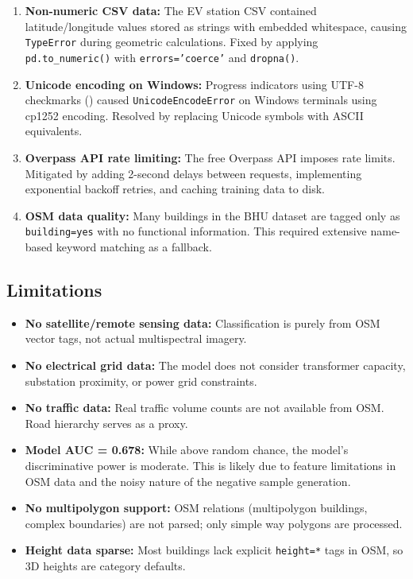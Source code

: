\documentclass[12pt, a4paper]{article}
\begin{document}
\begin{enumerate}
    \item \textbf{Non-numeric CSV data:} The EV station CSV contained 
    latitude/longitude values stored as strings with embedded 
    whitespace, causing \texttt{TypeError} during geometric 
    calculations. Fixed by applying \texttt{pd.to\_numeric()} with 
    \texttt{errors='coerce'} and \texttt{dropna()}.
    
    \item \textbf{Unicode encoding on Windows:} Progress indicators 
    using UTF-8 checkmarks (\checkmark) caused 
    \texttt{UnicodeEncodeError} on Windows terminals using cp1252 
    encoding. Resolved by replacing Unicode symbols with ASCII 
    equivalents.
    
    \item \textbf{Overpass API rate limiting:} The free Overpass API 
    imposes rate limits. Mitigated by adding 2-second delays between 
    requests, implementing exponential backoff retries, and caching 
    training data to disk.
    
    \item \textbf{OSM data quality:} Many buildings in the BHU 
    dataset are tagged only as \texttt{building=yes} with no 
    functional information. This required extensive name-based keyword 
    matching as a fallback.
\end{enumerate}

\subsection{Limitations}

\begin{itemize}
    \item \textbf{No satellite/remote sensing data:} Classification 
    is purely from OSM vector tags, not actual multispectral imagery.
    
    \item \textbf{No electrical grid data:} The model does not 
    consider transformer capacity, substation proximity, or power 
    grid constraints.
    
    \item \textbf{No traffic data:} Real traffic volume counts are 
    not available from OSM. Road hierarchy serves as a proxy.
    
    \item \textbf{Model AUC = 0.678:} While above random chance, the 
    model's discriminative power is moderate. This is likely due to 
    feature limitations in OSM data and the noisy nature of the 
    negative sample generation.
    
    \item \textbf{No multipolygon support:} OSM relations 
    (multipolygon buildings, complex boundaries) are not parsed; only 
    simple way polygons are processed.
    
    \item \textbf{Height data sparse:} Most buildings lack explicit 
    \texttt{height=*} tags in OSM, so 3D heights are category 
    defaults.
\end{itemize}
\end{document}
